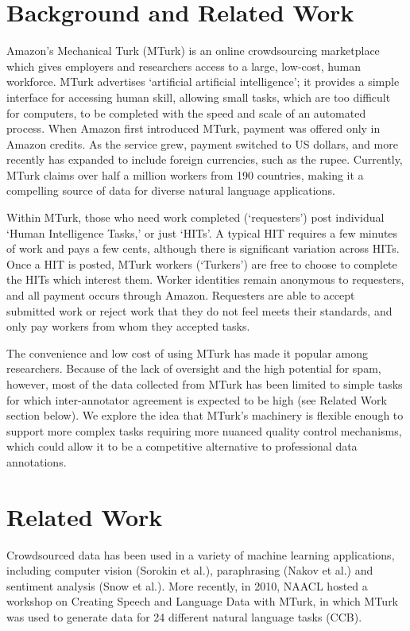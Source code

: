 \documentclass[11pt]{article}
\begin{document}
\section{Background and Related Work}
Amazon's Mechanical Turk (MTurk) is an online crowdsourcing marketplace which gives employers and researchers access to a large, low-cost, human workforce. MTurk advertises `artificial artificial intelligence'; it provides a simple interface for accessing human skill, allowing small tasks, which are too difficult for computers, to be completed with the speed and scale of an automated process. When Amazon first introduced MTurk, payment was offered only in Amazon credits. As the service grew, payment switched to US dollars, and more recently has expanded to include foreign currencies, such as the rupee. Currently, MTurk claims over half a million workers from 190 countries, making it a compelling source of data for diverse natural language applications.

Within MTurk, those who need work completed (`requesters') post individual `Human Intelligence Tasks,' or just `HITs'. A typical HIT  requires a few minutes of work and pays a few cents, although there is significant variation across HITs. Once a HIT is posted, MTurk workers (`Turkers') are free to choose to complete the HITs which interest them. Worker identities remain anonymous to requesters, and all payment occurs through Amazon. Requesters are able to accept submitted work or reject work that they do not feel meets their standards, and only pay workers from whom they accepted tasks. 



The convenience and low cost of using MTurk has made it popular among researchers. Because of the lack of oversight and the high potential for spam, however, most of the data collected from MTurk has been limited to simple tasks for which inter-annotator agreement is expected to be high (see Related Work section below). We explore the idea that MTurk's machinery is flexible enough to support more complex tasks requiring more nuanced quality control mechanisms, which could allow it to be a competitive alternative to professional data annotations.

\section{Related Work}
Crowdsourced data has been used in a variety of machine learning applications, including computer vision (Sorokin et al.), paraphrasing (Nakov et al.) and sentiment analysis (Snow et al.). More recently, in 2010, NAACL hosted a workshop on Creating Speech and Language Data with MTurk, in which MTurk was used to generate data for 24 different natural language tasks (CCB).
\end{document}
